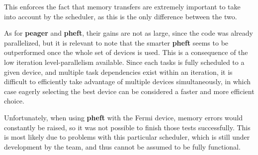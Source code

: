 \documentclass[main.tex]{subfiles}
\begin{document}
This enforces the fact that memory transfers are extremely important to take into account by the scheduler, as this is the only difference between the two.

As for \textbf{peager} and \textbf{pheft}, their gains are not as large, since the \cpu code was already parallelized, but it is relevant to note that the smarter \textbf{pheft} seems to be outperformed once the whole set of devices is used. This is a consequence of the low iteration level-parallelism available. Since each tasks is fully scheduled to a given device, and multiple task dependencies exist within an iteration, it is difficult to efficiently take advantage of multiple devices simultaneously, in which case eagerly selecting the best device can be considered a faster and more efficient choice.

Unfortunately, when using \textbf{pheft} with the Fermi device, memory errors would constantly be raised, so it was not possible to finish those tests successfully. This is most likely due to problems with this particular scheduler, which is still under development by the \starpu team, and thus cannot be assumed to be fully functional.
\end{document}
